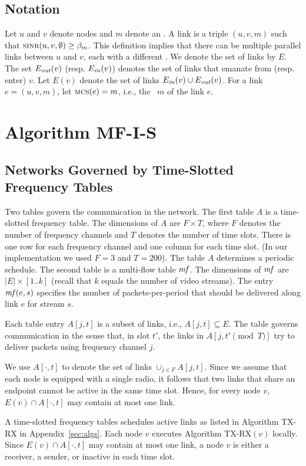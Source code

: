 \documentclass[12pt,oneside,english,a4paper]{book}
\theoremstyle{plain}
\theoremstyle{definition}
\theoremstyle{Theorem}
\theoremstyle{plain}
\newenvironment{proof sketch}[1]{\noindent {\emph{Proof sketch of #1:}}}{\hfill \qed}
\newcommand{\SINR}{\text{\sc{sinr}}}
\newcommand{\mf}{\text{\emph{mf}}}
\newcommand{\MCS}{\text{\sc{mcs}}}
\newcommand{\Ein}{E_{\text{\emph{in}}}}
\newcommand{\Eout}{E_{\text{\emph{out}}}}
\newcommand{\algA}{\textsc{MF-I-S}}
\begin{document}
\section{Notation}
Let $u$ and $v$ denote nodes and $m$ denote an \MCS.  A link is a
triple $(u,v,m)$ such that $\SINR(u,v,\emptyset)\geq \beta_m$.  This
definition implies that there can be multiple parallel links between
$u$ and $v$, each with a different \MCS.
%
We denote the set of links by $E$. The set $\Eout(v)$ (resp.
$\Ein(v)$) denotes the set of links that emanate from (resp. enter)
$v$. Let $E(v)$ denote the set of links $\Ein(v)\cup \Eout(v)$.
%
For a link $e=(u,v,m)$, let $\MCS(e)=m$, i.e., the \MCS\ $m$ of the link $e$.



\chapter{Algorithm \algA}\label{sec:outline}
\section{Networks Governed by Time-Slotted Frequency Tables}\label{sec:govern}
Two tables govern the communication in the network.  The first table
$A$ is a time-slotted frequency table. The dimensions of $A$ are
$F\times T$, where $F$ denotes the number of frequency channels and
$T$ denotes the number of time slots.  There is one row for each
frequency channel and one column for each time slot. (In our
implementation we used $F=3$ and $T=200$).  The table $A$ determines a
periodic schedule.  The second table is a multi-flow table $\mf$. The
dimensions of $\mf$ are $|E|\times [1..k]$ (recall that $k$ equals the
number of video streams).  The entry $\mf(e,s)$ specifies the number
of packets-per-period that should be delivered along link $e$ for
stream $s$.

Each table entry $A[j,t]$ is a subset of links,
i.e., $A[j,t]\subseteq E$.  The table governs communication in the
sense that, in slot $t'$, the links in $A[j,t' \pmod T]$ try to deliver packets
using frequency channel $j$.

We use $A[\cdot,t]$ to denote the set of links $\cup_{j\in F}
A[j,t]$.  Since we assume that each node is equipped with a single
radio, it follows that two links that share an endpoint cannot be
active in the same time slot.  Hence, for every node $v$, $E(v) \cap
A[\cdot ,t]$ may contain at most one link.

A time-slotted frequency tables schedules active links as listed in
Algorithm TX-RX in Appendix~\ref{sec:algs}.  Each node $v$
executes Algorithm TX-RX$(v)$ locally.  Since $E(v) \cap A[\cdot ,t]$
may contain at most one link, a node $v$ is either a receiver, a
sender, or inactive in each time slot.
\end{document}

